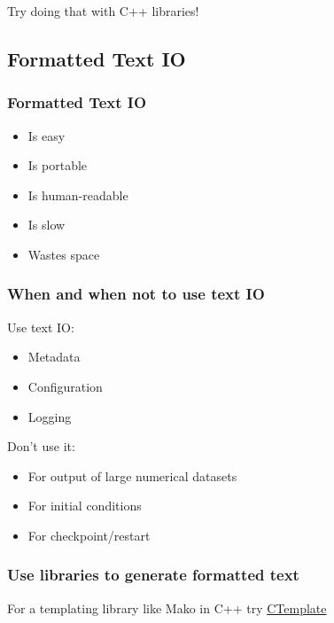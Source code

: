 Try doing that with C++ libraries!

\subsection{Formatted Text IO}\label{formatted-text-io}

\subsubsection{Formatted Text IO}\label{formatted-text-io-1}

\begin{itemize}
\itemsep1pt\parskip0pt
\item
  Is easy
\item
  Is portable
\item
  Is human-readable
\item
  Is slow
\item
  Wastes space
\end{itemize}

\subsubsection{When and when not to use text
IO}\label{when-and-when-not-to-use-text-io}

Use text IO:

\begin{itemize}
\itemsep1pt\parskip0pt
\item
  Metadata
\item
  Configuration
\item
  Logging
\end{itemize}

Don't use it:

\begin{itemize}
\itemsep1pt\parskip0pt
\item
  For output of large numerical datasets
\item
  For initial conditions
\item
  For checkpoint/restart
\end{itemize}

\subsubsection{Use libraries to generate formatted
text}\label{use-libraries-to-generate-formatted-text}

For a templating library like Mako in C++ try
\href{https://code.google.com/p/ctemplate/}{CTemplate}

